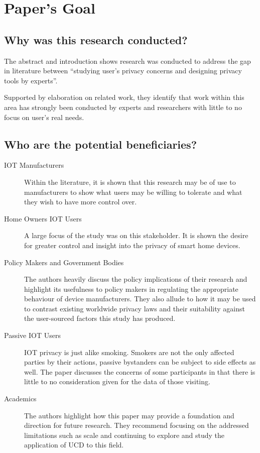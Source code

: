 \section{Paper's Goal}
\subsection{Why was this research conducted?}

The abstract and introduction shows research was conducted to address the gap in literature between ``studying user's privacy concerns and designing privacy tools by experts''.

Supported by elaboration on related work, they identify that work within this area has strongly been conducted by experts and researchers with little to no focus on user's real needs. 
\subsection{Who are the potential beneficiaries?}

\begin{description}
	\item[IOT Manufacturers] Within the literature, it is shown that this research may be of use to manufacturers to show what users may be willing to tolerate and what they wish to have more control over.
	
	\item[Home Owners IOT Users] A large focus of the study was on this stakeholder. It is shown the desire for greater control and insight into the privacy of smart home devices. 
	
	\item[Policy Makers and Government Bodies] The authors heavily discuss the policy implications of their research and highlight its usefulness to policy makers in regulating the appropriate behaviour of device manufacturers. They also allude to how it may be used to contrast existing worldwide privacy laws and their suitability against the user-sourced factors this study has produced. 
	
	\item[Passive IOT Users] IOT privacy is just alike smoking. Smokers are not the only affected parties by their actions, passive bystanders can be subject to side effects as well. The paper discusses the concerns of some participants in that there is little to no consideration given for the data of those visiting.
	
	\item[Academics] The authors highlight how this paper may provide a foundation and direction for future research. They recommend focusing on the addressed limitations such as scale and continuing to explore and study the application of UCD to this field.
\end{description}



